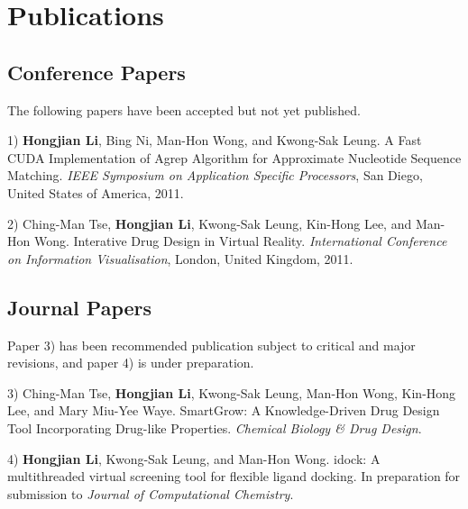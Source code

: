 \chapter{Publications}

\section{Conference Papers}

The following papers have been accepted but not yet published.

1) \textbf{Hongjian Li}, Bing Ni, Man-Hon Wong, and Kwong-Sak Leung. A Fast CUDA Implementation of Agrep Algorithm for Approximate Nucleotide Sequence Matching. \textit{IEEE Symposium on Application Specific Processors}, San Diego, United States of America, 2011.

2) Ching-Man Tse, \textbf{Hongjian Li}, Kwong-Sak Leung, Kin-Hong Lee, and Man-Hon Wong. Interative Drug Design in Virtual Reality. \textit{International Conference on Information Visualisation}, London, United Kingdom, 2011.

\section{Journal Papers}

Paper 3) has been recommended publication subject to critical and major revisions, and paper 4) is under preparation.

3) Ching-Man Tse, \textbf{Hongjian Li}, Kwong-Sak Leung, Man-Hon Wong, Kin-Hong Lee, and Mary Miu-Yee Waye. SmartGrow: A Knowledge-Driven Drug Design Tool Incorporating Drug-like Properties. \textit{Chemical Biology \& Drug Design}.

4) \textbf{Hongjian Li}, Kwong-Sak Leung, and Man-Hon Wong. idock: A multithreaded virtual screening tool for flexible ligand docking. In preparation for submission to \textit{Journal of Computational Chemistry}.

\chapterend
